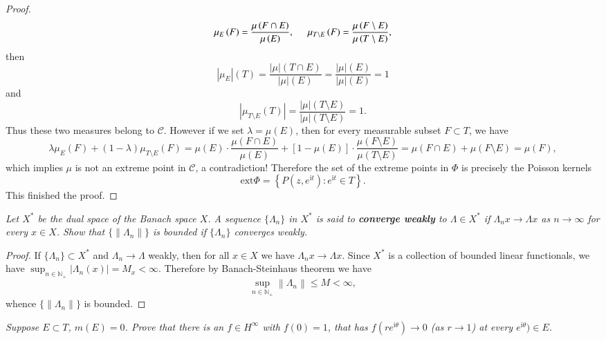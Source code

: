 \begin{proof}
$$
\mu _E\left( F \right) =\frac{\mu \left( F\cap E \right)}{\mu \left( E \right)},\hspace{0.5cm}\mu _{T\setminus E}\left( F \right) =\frac{\mu \left( F\setminus E \right)}{\mu \left( T\setminus E \right)},
$$
then 
$$
\left| \mu _E \right|\left( T \right) =\frac{\left| \mu \right|\left( T\cap E \right)}{\left| \mu \right|\left( E \right)}=\frac{\left| \mu \right|\left( E \right)}{\left| \mu \right|\left( E \right)}=1
$$
and 
$$
\left| \mu _{T\setminus E}\left( T \right) \right|=\frac{\left| \mu \right|\left( T\setminus E \right)}{\left| \mu \right|\left( T\setminus E \right)}=1.
$$
Thus these two measures belong to $\mathscr{C}$. However if we set $\lambda=\mu(E)$, then for every measurable subset $F\subset T$, we have 
$$
\lambda \mu _E\left( F \right) +\left( 1-\lambda \right) \mu _{T\setminus E}\left( F \right) =\mu \left( E \right) \cdot \frac{\mu \left( F\cap E \right)}{\mu \left( E \right)}+\left[ 1-\mu \left( E \right) \right] \cdot \frac{\mu \left( F\setminus E \right)}{\mu \left( T\setminus E \right)}=\mu \left( F\cap E \right) +\mu \left( F\setminus E \right) =\mu \left( F \right) ,
$$
which implies $\mu$ is not an extreme point in $\mathscr{C}$, a contradiction! Therefore the set of the extreme points in $\Phi$ is precisely the Poisson kernels 
$$
\mathrm{ext}\Phi =\left\{ P\left( z,e^{\mathrm{i}t} \right) :e^{\mathrm{i}t}\in T \right\} .
$$
This finished the proof.
\end{proof}
\begin{problem}\em
Let $X^*$ be the dual space of the Banach space $X$. A sequence $\{\Lambda_n\}$ in $X^*$ is said to \textbf{converge weakly} to $\Lambda\in X^*$ if $\Lambda_nx\to\Lambda x$ as $n\to\infty$ for every $x\in X$. Show that $\{\|\Lambda_n\|\}$ is bounded if $\{\Lambda_n\}$ converges weakly.
\end{problem}
\begin{proof}
If $\{\Lambda_n\}\subset X^*$ and $\Lambda_n\to\Lambda$ weakly, then for all $x\in X$ we have $\Lambda_nx\to\Lambda x$. Since $X^*$ is a collection of bounded linear functionals, we have $\sup_{n\in\mathbb{N}_+}|\Lambda_n(x)|=M_x<\infty$. Therefore by Banach-Steinhaus theorem we have 
$$
\mathop {\mathrm{sup}} \limits_{n\in \mathbb{N} _+}\left\| \Lambda _n \right\| \le M<\infty ,
$$
whence $\{\|\Lambda_n\|\}$ is bounded.
\end{proof}
\begin{problem}\em
Suppose $E\subset T$, $m(E)=0$. Prove that there is an $f\in H^\infty$ with $f(0)=1$, that has $f(re^{\mathrm{i}\theta})\to 0$ (as $r\to 1$) at every $e^{\mathrm{i}\theta})\in E$.
\end{problem}
